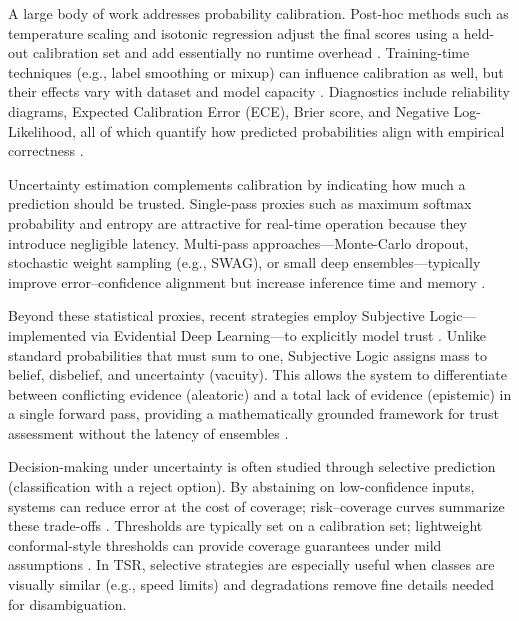 \documentclass[11pt,a4paper]{article}
\begin{document}
A large body of work addresses probability calibration. Post-hoc methods such as temperature scaling and isotonic regression adjust the final scores using a held-out calibration set and add essentially no runtime overhead \cite{guo2017calibration,niculescu2005predicting}. Training-time techniques (e.g., label smoothing or mixup) can influence calibration as well, but their effects vary with dataset and model capacity \cite{minderer2021revisiting}. Diagnostics include reliability diagrams, Expected Calibration Error (ECE), Brier score, and Negative Log-Likelihood, all of which quantify how predicted probabilities align with empirical correctness \cite{niculescu2005predicting,guo2017calibration}.

Uncertainty estimation complements calibration by indicating how much a prediction should be trusted. Single-pass proxies such as maximum softmax probability and entropy are attractive for real-time operation because they introduce negligible latency. Multi-pass approaches—Monte-Carlo dropout, stochastic weight sampling (e.g., SWAG), or small deep ensembles—typically improve error–confidence alignment but increase inference time and memory \cite{gal2016dropout,maddox2019simple,lakshminarayanan2017simple}.

Beyond these statistical proxies, recent strategies employ Subjective Logic—implemented via Evidential Deep Learning—to explicitly model trust \cite{sensoy2018evidential}. Unlike standard probabilities that must sum to one, Subjective Logic assigns mass to belief, disbelief, and uncertainty (vacuity). This allows the system to differentiate between conflicting evidence (aleatoric) and a total lack of evidence (epistemic) in a single forward pass, providing a mathematically grounded framework for trust assessment without the latency of ensembles \cite{han2025uncertainty}.

Decision-making under uncertainty is often studied through selective prediction (classification with a reject option). By abstaining on low-confidence inputs, systems can reduce error at the cost of coverage; risk–coverage curves summarize these trade-offs \cite{geifman2019selectivenet}. Thresholds are typically set on a calibration set; lightweight conformal-style thresholds can provide coverage guarantees under mild assumptions \cite{vovk2005algorithmic}. In TSR, selective strategies are especially useful when classes are visually similar (e.g., speed limits) and degradations remove fine details needed for disambiguation.
\end{document}
